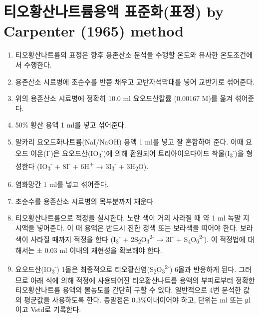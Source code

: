 \documentclass[
]{book}
\providecommand{\tightlist}{%
  \setlength{\itemsep}{0pt}\setlength{\parskip}{0pt}}
\begin{document}
\hypertarget{uxd2f0uxc624uxd669uxc0b0uxb098uxd2b8uxb968uxc6a9uxc561-uxd45cuxc900uxd654uxd45cuxc815-by-carpenter-1965-method}{%
\section{티오황산나트륨용액 표준화(표정) by Carpenter (1965) method}\label{uxd2f0uxc624uxd669uxc0b0uxb098uxd2b8uxb968uxc6a9uxc561-uxd45cuxc900uxd654uxd45cuxc815-by-carpenter-1965-method}}

\begin{enumerate}
\def\labelenumi{\arabic{enumi}.}
\tightlist
\item
  티오황산나트륨의 표정은 향후 용존산소 분석을 수행할 온도와 유사한 온도조건에서 수행한다.
\item
  용존산소 시료병에 초순수를 반쯤 채우고 교반자석막대를 넣어 교반기로 섞어준다.
\item
  위의 용존산소 시료병에 정확히 10.0 ml 요오드산칼륨 (0.00167 M)를 옮겨 섞어준다.
\item
  50\% 황산 용액 1 ml를 넣고 섞어준다.
\item
  알카리 요오드화나트륨(NaI/NaOH) 용액 1 ml를 넣고 잘 혼합하여 준다. 이때 요오드 이온(I\textsuperscript{-})은 요오드산(IO\textsubscript{3}\textsuperscript{-})에 의해 환원되어 트리아이오다이드 착물(I\textsubscript{3}\textsuperscript{-})을 형성한다 (IO\textsubscript{3}\textsuperscript{-} + 8I\textsuperscript{-} + 6H\textsuperscript{+} → 3I\textsubscript{3}\textsuperscript{-} + 3H\textsubscript{2}O).
\item
  염화망간 1 ml를 넣고 섞어준다.
\item
  초순수를 용존산소 시료병의 목부분까지 채운다\\
\item
  티오황산나트륨으로 적정을 실시한다. 노란 색이 거의 사라질 때 약 1 ml 녹말 지시액을 넣어준다. 이 때 용액은 반드시 진한 청색 또는 보라색을 띠어야 한다. 보라색이 사라질 때까지 적정을 한다 (I\textsubscript{3}\textsuperscript{-} + 2S\textsubscript{2}O\textsubscript{3}\textsuperscript{2-} → 3I\textsuperscript{-} + S\textsubscript{4}O\textsubscript{6}\textsuperscript{2-}). 이 적정법에 대해서는 ± 0.03 ml 이내의 재현성을 확보해야 한다.
\item
  요오드산(IO\textsubscript{3}\textsuperscript{-}) 1몰은 최종적으로 티오황산염(S\textsubscript{2}O\textsubscript{3}\textsuperscript{2-}) 6몰과 반응하게 된다. 그러므로 아래 식에 의해 적정에 사용되어진 티오황산나트륨 용액의 부피로부터 정확한 티오황산나트륨 용액의 몰농도를 간단히 구할 수 있다. 일반적으로 4번 분석한 값의 평균값을 사용하도록 한다. 종말점은 0.3\%이내이어야 하고, 단위는 ml 또는 μl이고 Vstd로 기록한다.
\end{enumerate}
\end{document}
